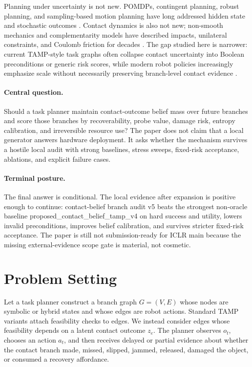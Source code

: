 \documentclass{article}
\newcommand{\method}{contact-belief branch audit v5}
\begin{document}
Planning under uncertainty is not new. POMDPs, contingent planning, robust planning, and sampling-based motion planning have long addressed hidden state and stochastic outcomes \citep{kaelbling1998planning,kurniawati2008sarsop,lavalle2006planning}. Contact dynamics is also not new; non-smooth mechanics and complementarity models have described impacts, unilateral constraints, and Coulomb friction for decades \citep{moreau1999contact,stewart1996implicit,posa2014direct,todorov2012mujoco,pfrommer2020contactnets}. The gap studied here is narrower: current TAMP-style task graphs often collapse contact uncertainty into Boolean preconditions or generic risk scores, while modern robot policies increasingly emphasize scale without necessarily preserving branch-level contact evidence \citep{mandlekar2021robomimic,chi2023diffusion,brohan2022rt1,brohan2023rt2,openx2023rtx,khazatsky2024droid,octo2024}.

\paragraph{Central question.}
Should a task planner maintain contact-outcome belief mass over future branches and score those branches by recoverability, probe value, damage risk, entropy calibration, and irreversible resource use? The paper does not claim that a local generator answers hardware deployment. It asks whether the mechanism survives a hostile local audit with strong baselines, stress sweeps, fixed-risk acceptance, ablations, and explicit failure cases.

\paragraph{Terminal posture.}
The final answer is conditional. The local evidence after expansion is positive enough to continue: \method{} beats the strongest non-oracle baseline proposed\_contact\_belief\_tamp\_v4 on hard success and utility, lowers invalid preconditions, improves belief calibration, and survives stricter fixed-risk acceptance. The paper is still not submission-ready for ICLR main because the missing external-evidence scope gate is material, not cosmetic.

\section{Problem Setting}
Let a task planner construct a branch graph $G=(V,E)$ whose nodes are symbolic or hybrid states and whose edges are robot actions. Standard TAMP variants attach feasibility checks to edges. We instead consider edges whose feasibility depends on a latent contact outcome $z_e$. The planner observes $o_t$, chooses an action $a_t$, and then receives delayed or partial evidence about whether the contact branch made, missed, slipped, jammed, released, damaged the object, or consumed a recovery affordance.
\end{document}
